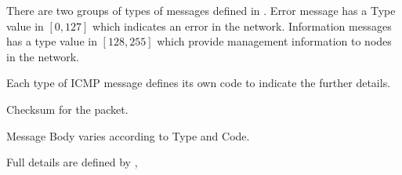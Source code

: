 \begin{description}[style=nextline]
\item[\textbf{Type}]
There are two groups of types of messages defined in \cite{rfc4443}. Error message has a Type value in $[0,127]$ which indicates an error in the network. Information messages has a type value in $[128,255]$ which provide management information to nodes in the network.
\item[\textbf{Code}]
Each type of ICMP message defines its own code to indicate the further details.
\item[\textbf{Checksum}]
Checksum for the packet.
\item[\textbf{Message Body}]
Message Body varies according to Type and Code.
\end{description}
Full details are defined by \cite{rfc4443},

